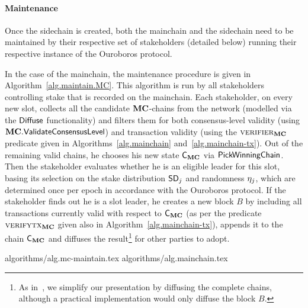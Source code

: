 

\paragraph{Maintenance}

Once the sidechain is created, both the mainchain and the sidechain need to be
maintained by their respective set of stakeholders (detailed below) running
their respective instance of the Ouroboros protocol.

In the case of the mainchain, the maintenance procedure is given
in Algorithm~\ref{alg.maintain.MC}.
This algorithm is run by all stakeholders controlling stake that is recorded on
the mainchain. Each stakeholder, on every new slot, collects all the candidate
$\mathbf{MC}$-chains from the network (modelled via the $\mathsf{Diffuse}$ functionality) and
filters them for both consensus-level validity (using $\mathbf{MC}.\mathsf{ValidateConsensusLevel}$) and
transaction validity (using the $\textsc{verifier}_{\mathbf{MC}}$ predicate given in
Algorithms~\ref{alg.mainchain} and~\ref{alg.mainchain-tx}). Out of the remaining valid chains, he chooses
his new state $\mathsf{C}_{\mathbf{MC}}$ via $\mathsf{PickWinningChain}$. Then the stakeholder
evaluates whether he is an eligible leader for this slot, basing its selection
on the stake distribution $\mathsf{SD}_j$ and randomness $\eta_j$, which are determined
once per epoch
in accordance with the Ouroboros protocol.
If the stakeholder finds out he is a slot leader, he creates a new block $B$ by
including all transactions currently valid with respect to $\mathsf{C}_{\mathbf{MC}}$
(as per the predicate $\textsc{verifytx}_{\mathbf{MC}}$ given also in Algorithm~\ref{alg.mainchain-tx}),
appends it to the chain $\mathsf{C}_{\mathbf{MC}}$ and diffuses the result\footnote{
As in~\cite{ouroboros,praos}, we simplify our
presentation by diffusing the complete chains,
although a practical implementation would only diffuse the block $B$.}
for other parties to adopt.

{algorithms/alg.mc-maintain.tex}
{algorithms/alg.mainchain.tex}


